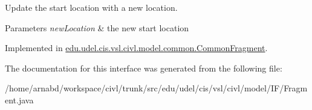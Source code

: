 Update the start location with a new location. 


\begin{DoxyParams}{Parameters}
{\em new\+Location} & the new start location \\
\hline
\end{DoxyParams}


Implemented in \hyperlink{classedu_1_1udel_1_1cis_1_1vsl_1_1civl_1_1model_1_1common_1_1CommonFragment_a030d5185dc9f8e58ce5219076b873a9b}{edu.\+udel.\+cis.\+vsl.\+civl.\+model.\+common.\+Common\+Fragment}.



The documentation for this interface was generated from the following file\+:\begin{DoxyCompactItemize}
\item 
/home/arnabd/workspace/civl/trunk/src/edu/udel/cis/vsl/civl/model/\+I\+F/Fragment.\+java\end{DoxyCompactItemize}
